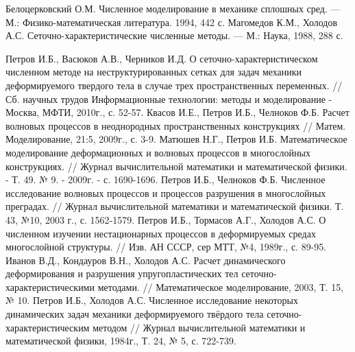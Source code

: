 \begin{thebibliography}{99}
Белоцерковский О.М. Численное моделирование в механике
сплошных сред. — М.: Физико-математическая литература. 1994, 442 с.
Магомедов К.М., Холодов А.С. Сеточно-характеристические
численные методы. — М.: Наука, 1988, 288 с.

Петров И.Б., Васюков А.В., Черников И.Д. О сеточно-характеристическом численном методе на неструктурированных сетках для задач механики деформируемого твердого тела в случае трех пространственных переменных. // Сб. научных трудов Информационные технологии: методы и моделирование - Москва, МФТИ, 2010г., с. 52-57.
Квасов И.Е., Петров И.Б., Челноков Ф.Б. Расчет волновых процессов в неоднородных пространственных конструкциях // Матем. Моделирование, 21:5, 2009г., с. 3-9.
Матюшев Н.Г., Петров И.Б. Математическое моделирование деформационных и волновых процессов в многослойных конструкциях. // Журнал вычислительной математики и математической физики. - Т. 49. № 9. - 2009г. - с. 1690-1696.
Петров И.Б., Челноков Ф.Б. Численное исследование волновых процессов и процессов разрушения в многослойных преградах. // Журнал вычислительной математики и математической физики. Т. 43, №10, 2003 г., с. 1562-1579.
Петров И.Б., Тормасов А.Г., Холодов А.С. О численном изучении нестационарных процессов в деформируемых средах многослойной структуры. // Изв. АН СССР, сер МТТ, №4, 1989г., с. 89-95. 
Иванов В.Д., Кондауров В.Н., Холодов А.С. Расчет динамического деформирования и разрушения упругопластических тел сеточно-характеристическими методами. // Математическое моделирование, 2003, Т. 15, № 10.
Петров И.Б., Холодов А.С. Численное исследование некоторых динамических задач механики деформируемого твёрдого тела сеточно-характеристическим методом // Журнал вычислительной математики и математической физики, 1984г., Т. 24, № 5, с. 722-739.


\end{thebibliography}
